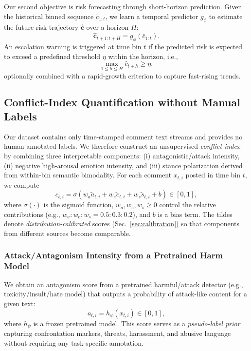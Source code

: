 \documentclass[journal]{IEEEtran}
\begin{document}
Our second objective is risk forecasting through short-horizon prediction. Given the historical binned sequence $\bar{c}_{1:t}$, we learn a temporal predictor $g_\phi$ to estimate the future risk trajectory $\mathbf{\hat{c}}$ over a horizon $H$:
\begin{equation}
\mathbf{\hat{c}}_{t+1:t+H} = g_\phi(\bar{c}_{1:t}).
\end{equation}
An escalation warning is triggered at time bin $t$ if the predicted risk is expected to exceed a predefined threshold $\eta$ within the horizon, i.e.,
\begin{equation}
\max_{1 \le h \le H} \hat{c}_{t+h} \ge \eta,
\end{equation}
optionally combined with a rapid-growth criterion to capture fast-rising trends.

\subsection{Conflict-Index Quantification without Manual Labels}\label{sec:conflict_index}

Our dataset contains only time-stamped comment text streams and provides no human-annotated labels. We therefore construct an unsupervised \emph{conflict index} by combining three interpretable components: (i) antagonistic/attack intensity, (ii) negative high-arousal emotion intensity, and (iii) stance polarization derived from within-bin semantic bimodality. For each comment $x_{t,i}$ posted in time bin $t$, we compute
\begin{equation}
c_{t,i} = \sigma\!\left(w_a \tilde{a}_{t,i} + w_e \tilde{e}_{t,i} + w_s \tilde{s}_{t,i} + b\right)\in[0,1],
\label{eq:conflict_index_fusion}
\end{equation}
where $\sigma(\cdot)$ is the sigmoid function, $w_a,w_e,w_s \ge 0$ control the relative contributions (e.g., $w_a:w_e:w_s = 0.5:0.3:0.2$), and $b$ is a bias term. The tildes denote \emph{distribution-calibrated} scores (Sec.~\ref{sec:calibration}) so that components from different sources become comparable.

\subsubsection{Attack/Antagonism Intensity from a Pretrained Harm Model}
We obtain an antagonism score from a pretrained harmful/attack detector (e.g., toxicity/insult/hate model) that outputs a probability of attack-like content for a given text:
\begin{equation}
a_{t,i} = h_{\psi}(x_{t,i}) \in [0,1],
\label{eq:attack_score}
\end{equation}
where $h_{\psi}$ is a frozen pretrained model. This score serves as a \emph{pseudo-label prior} capturing confrontation markers, threats, harassment, and abusive language without requiring any task-specific annotation.
\end{document}
